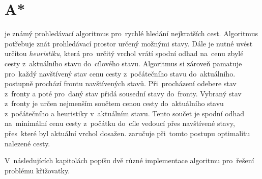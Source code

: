 \section{A*}\label{sec:a_star}


 je známý prohledávací algoritmus pro~rychlé hledání nejkratších cest.
Algoritmus potřebuje znát prohledávací prostor určený možnými stavy.
Dále je nutné uvést určitou \emph{heuristiku}, která pro~určitý vrchol vrátí
spodní odhad na~cenu zbylé cesty z~aktuálního stavu do~cílového stavu.
Algoritmus si zároveň pamatuje pro~každý navštívený stav cenu cesty z~počátečního stavu do~aktuálního.
 postupně prochází frontu navštívených stavů.
Při~procházení odebere stav z~fronty a poté pro~daný stav přidá sousední stavy do~fronty.
Vybraný stav z~fronty je určen nejmenším součtem cenou cesty
do~aktuálního stavu z~počátečního a heuristiky v~aktuálním stavu.
Tento součet je spodní odhad na~minimální cenu cesty z~počátku do~cíle vedoucí přes navštívené stavy,
přes~které byl aktuální vrchol dosažen.
 zaručuje při~tomto postupu optimalitu nalezené cesty.

V~následujících kapitolách popíšu dvě různé implementace  algoritmu pro~řešení problému křižovatky.








